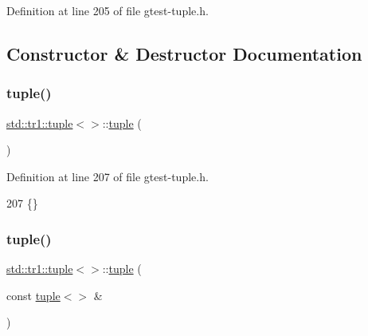 Definition at line 205 of file gtest-\/tuple.\+h.



\subsection{Constructor \& Destructor Documentation}
\mbox{\label{classstd_1_1tr1_1_1tuple_3_4_adcea1a41d0521157971339d279aad469}} 
\subsubsection{\texorpdfstring{tuple()}{tuple()}\hspace{0.1cm}{\footnotesize\ttfamily [1/2]}}
{\footnotesize\ttfamily \hyperlink{classstd_1_1tr1_1_1tuple}{std\+::tr1\+::tuple}$<$$>$\+::\hyperlink{classstd_1_1tr1_1_1tuple}{tuple} (\begin{DoxyParamCaption}{ }\end{DoxyParamCaption})\hspace{0.3cm}{\ttfamily [inline]}}



Definition at line 207 of file gtest-\/tuple.\+h.


\begin{DoxyCode}
207 \{\}
\end{DoxyCode}
\mbox{\label{classstd_1_1tr1_1_1tuple_3_4_aa857599acb126134e29dc5e53fd9d1a7}} 
\subsubsection{\texorpdfstring{tuple()}{tuple()}\hspace{0.1cm}{\footnotesize\ttfamily [2/2]}}
{\footnotesize\ttfamily \hyperlink{classstd_1_1tr1_1_1tuple}{std\+::tr1\+::tuple}$<$$>$\+::\hyperlink{classstd_1_1tr1_1_1tuple}{tuple} (\begin{DoxyParamCaption}\item[{const \hyperlink{classstd_1_1tr1_1_1tuple}{tuple}$<$$>$ \&}]{ }\end{DoxyParamCaption})\hspace{0.3cm}{\ttfamily [inline]}}



